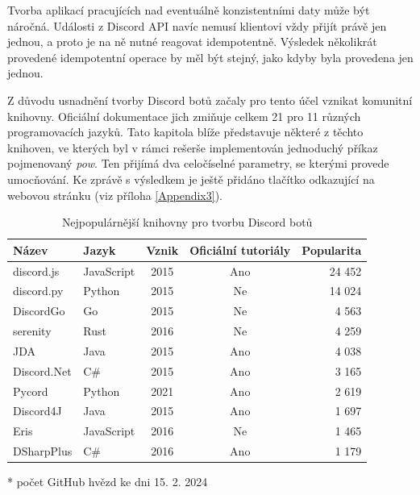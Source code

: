 \documentclass[FM]{tulthesis}
\begin{document}
	Tvorba aplikací pracujících nad eventuálně konzistentními daty může být náročná. Události z Discord API navíc nemusí klientovi vždy přijít právě jen jednou, a proto je na ně nutné reagovat idempotentně. Výsledek několikrát provedené idempotentní operace by měl být stejný, jako kdyby byla provedena jen jednou. \cite{book_distributedSystemsUnderstanding}
	
	Z důvodu usnadnění tvorby Discord botů začaly pro tento účel vznikat komunitní knihovny. Oficiální dokumentace jich zmiňuje celkem 21 pro 11 různých programovacích jazyků. Tato kapitola blíže představuje některé z těchto knihoven, ve kterých byl v rámci rešerše implementován jednoduchý příkaz pojmenovaný \textit{pow}. Ten přijímá dva celočíselné parametry, se kterými provede umocňování. Ke zprávě s výsledkem je ještě přidáno tlačítko odkazující na webovou stránku (viz příloha \ref{Appendix3}).
	
	\begin{table}[ht]
		\centering
		\caption{Nejpopulárnější knihovny pro tvorbu Discord botů}\medskip
		\begin{threeparttable}
			\begin{tabular}{ l l c c r }
				\textbf{Název} & \textbf{Jazyk} & \textbf{Vznik} & \textbf{Oficiální tutoriály} & \textbf{Popularita}\tnote{*} \\\hline
				discord.js	& JavaScript & 2015 & Ano & 24 452 \\
				discord.py	& Python	 & 2015 & Ne  & 14 024 \\
				DiscordGo	& Go		 & 2015 & Ne  &  4 563 \\
				serenity	& Rust		 & 2016 & Ne  &  4 259 \\
				JDA			& Java		 & 2015 & Ano &  4 038 \\
				Discord.Net & C\#		 & 2015 & Ano &  3 165 \\
				Pycord		& Python	 & 2021 & Ano &  2 619 \\
				Discord4J	& Java		 & 2015 & Ano &  1 697 \\
				Eris		& JavaScript & 2016 & Ne  &  1 465 \\
				DSharpPlus	& C\#		 & 2016 & Ano &  1 179 \\
			\hline\end{tabular}
			\begin{tablenotes}
				\item[*] počet GitHub hvězd ke dni 15. 2. 2024
			\end{tablenotes}
		\end{threeparttable}
	\end{table}
	
\end{document}
